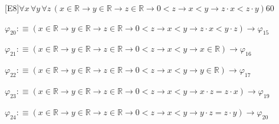 \begin{fullproof}{[E8]}{$\forall x\,\forall y\,\forall z\,(x \in \mathbb{R} \to y \in \mathbb{R} \to z \in \mathbb{R} \to 0 < z \to x < y \to z \cdot x < z \cdot y)$}{60}
\begin{abbrevlist}
\item $\varphi_{20} :\equiv (x \in \mathbb{R} \to y \in \mathbb{R} \to z \in \mathbb{R} \to 0 < z \to x < y \to z \cdot x < y \cdot z) \to \varphi_{15}$
\item $\varphi_{21} :\equiv (x \in \mathbb{R} \to y \in \mathbb{R} \to z \in \mathbb{R} \to 0 < z \to x < y \to x \in \mathbb{R}) \to \varphi_{16}$
\item $\varphi_{22} :\equiv (x \in \mathbb{R} \to y \in \mathbb{R} \to z \in \mathbb{R} \to 0 < z \to x < y \to y \in \mathbb{R}) \to \varphi_{17}$
\item $\varphi_{23} :\equiv (x \in \mathbb{R} \to y \in \mathbb{R} \to z \in \mathbb{R} \to 0 < z \to x < y \to x \cdot z = z \cdot x) \to \varphi_{19}$
\item $\varphi_{24} :\equiv (x \in \mathbb{R} \to y \in \mathbb{R} \to z \in \mathbb{R} \to 0 < z \to x < y \to y \cdot z = z \cdot y) \to \varphi_{20}$
\end{abbrevlist}
\end{fullproof}
